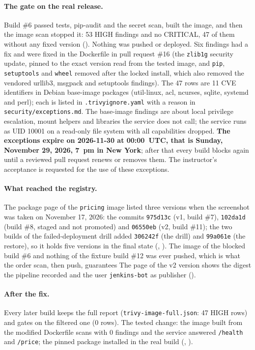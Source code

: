 \paragraph{The gate on the real release.} Build \#6 passed tests, pip-audit and the secret scan, built the image, and then the image scan stopped it: 53 HIGH findings and no CRITICAL, 47 of them without any fixed version ().
Nothing was pushed or deployed. Six findings had a fix and were fixed in the Dockerfile in pull request \#16 (the \texttt{zlib1g} security update, pinned to the exact version read from the tested image, and \texttt{pip}, \texttt{setuptools} and \texttt{wheel} removed
after the locked install, which also removed the vendored urllib3, msgpack and setuptools findings). The 47 rows are 11 CVE identifiers in Debian base-image packages (util-linux, acl, ncurses, sqlite, systemd and perl); each is listed in \texttt{.trivyignore.yaml}
with a reason in \texttt{security/exceptions.md}. The base-image findings are about local privilege escalation, mount helpers and libraries the service does not call; the service runs as UID 10001 on a read-only file system with all capabilities dropped.
\textbf{The exceptions expire on 2026-11-30 at 00:00~UTC, that is Sunday, November 29, 2026, 7~pm in New York}; after that every build blocks again until a reviewed pull request renews or removes them. The instructor's acceptance is requested for the use of these exceptions.

\paragraph{What reached the registry.} The package page of the \texttt{pricing} image listed three versions when the screenshot was taken on November 17, 2026: the commits \texttt{975d13c} (v1, build \#7), \texttt{102da1d} (build \#8, staged and not promoted) and \texttt{06550eb} (v2, build \#11); the two builds of the failed-deployment drill added \texttt{306242f} (the drill) and \texttt{99a061e} (the restore), so it holds five versions in the final state (, ). The image of the blocked build \#6 and nothing of the fixture build \#12 was ever pushed, which is what the order scan, then push, guarantees The page of the v2 version shows the digest the pipeline recorded and the user \texttt{jenkins-bot} as publisher ().

\paragraph{After the fix.} Every later build keeps the full report (\texttt{trivy-image-full.json}: 47 HIGH rows) and gates on the filtered one (0 rows). The tested change: the image built from the modified Dockerfile scans with 0 findings and the service
answered \texttt{/health} and \texttt{/price}; the pinned package installed in the real build (, ).

